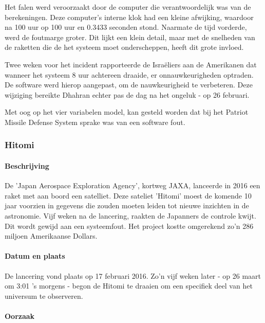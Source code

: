 \documentclass{article}
\begin{document}
					Het falen werd veroorzaakt door de computer die verantwoordelijk was van de berekeningen. Deze computer's interne klok had een kleine afwijking, waardoor na 100 uur op 100 uur en 0.3433 seconden stond. Naarmate de tijd vorderde, werd de foutmarge groter. \cite{skeel1992roundoff} Dit lijkt een klein detail, maar met de snelheden van de raketten die de het systeem moet onderscheppen, heeft dit grote invloed.  \par

					Twee weken voor het incident rapporteerde de Israëliers aan de Amerikanen dat wanneer het systeem 8 uur achtereen draaide, er onnauwkeurigheden optraden. De software werd hierop aangepast, om de nauwkeurigheid te verbeteren. Deze wijziging bereikte Dhahran echter pas de dag na het ongeluk - op 26 februari. \cite{general1992patriot} \par

					Met oog op het vier variabelen model, kan gesteld worden dat bij het Patriot Missile Defense System sprake was van een software fout. \par
			
			\subsubsection{Hitomi}

				\paragraph{Beschrijving}

					De 'Japan Aerospace Exploration Agency', kortweg JAXA, lanceerde in 2016 een raket met aan boord een satelliet. Deze sateliet 'Hitomi' moest de komende 10 jaar voorzien in gegevens die zouden moeten leiden tot nieuwe inzichten in de astronomie. Vijf weken na de lancering, raakten de Japanners de controle kwijt. Dit wordt gewijd aan een systeemfout. Het project kostte omgerekend zo'n 286 miljoen Amerikaanse Dollars.

				\paragraph{Datum en plaats}

					De lancering vond plaats op 17 februari 2016. Zo'n vijf weken later - op 26 maart om 3:01 's morgens - begon de Hitomi te draaien om een specifiek deel van het universum te observeren.

				\paragraph{Oorzaak}
\end{document}
